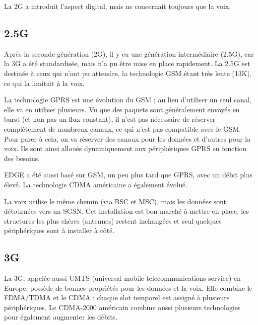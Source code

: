   	La 2G a introduit l'aspect digital, mais ne concernait toujours que la voix.
	
	
	\subsection{2.5G}
  	
	Après la seconde génération (2G), il y eu une génération intermédiaire (2.5G), car la 3G a été standardisée, mais n'a pu être mise en place rapidement. La 2.5G est destinée à ceux qui n'ont pu attendre, la technologie GSM étant très lente (13K), ce qui la limitait à la voix.
	
	La technologie GPRS est une évolution du GSM ; au lieu d'utiliser un seul canal, elle va en utiliser plusieurs. Vu que des paquets sont généralement envoyés en burst (et non pas un flux constant), il n'est pas nécessaire de réserver complètement de nombreux canaux, ce qui n'est pas compatible avec le GSM. Pour parer à cela, on va réserver des canaux pour les données et d'autres pour la voix. Ils sont ainsi alloués dynamiquement aux périphériques GPRS en fonction des besoins.
  
	EDGE a été aussi basé sur GSM, un peu plus tard que GPRS, avec un débit plus élevé. La technologie CDMA américaine a également évolué.
	
	
	
	La voix utilise le même chemin (via BSC et MSC), mais les données sont détournées vers un SGSN. Cet installation est bon marché à mettre en place, les structures les plus chères (antennes) restent inchangées et seul quelques périphériques sont à installer à côté.
  
	\subsection{3G}
	
	La 3G, appelée aussi UMTS (universal mobile telecommunications service) en Europe, possède de bonnes propriétés pour les données et la voix. Elle combine le FDMA/TDMA et le CDMA : chaque slot temporel est assigné à plusieurs périphériques. Le CDMA-2000 américain combine aussi plusieurs technologies pour également augmenter les débits.
      
